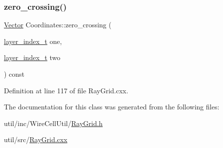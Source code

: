 \subsubsection{\texorpdfstring{zero\+\_\+crossing()}{zero\_crossing()}}
{\footnotesize\ttfamily \hyperlink{namespace_wire_cell_aa3c82d3ba85f032b0d278b7004846800}{Vector} Coordinates\+::zero\+\_\+crossing (\begin{DoxyParamCaption}\item[{\hyperlink{namespace_wire_cell_1_1_ray_grid_ab7562e54b58eede813d5b70b5eb85812}{layer\+\_\+index\+\_\+t}}]{one,  }\item[{\hyperlink{namespace_wire_cell_1_1_ray_grid_ab7562e54b58eede813d5b70b5eb85812}{layer\+\_\+index\+\_\+t}}]{two }\end{DoxyParamCaption}) const}



Definition at line 117 of file Ray\+Grid.\+cxx.



The documentation for this class was generated from the following files\+:\begin{DoxyCompactItemize}
\item 
util/inc/\+Wire\+Cell\+Util/\hyperlink{_ray_grid_8h}{Ray\+Grid.\+h}\item 
util/src/\hyperlink{_ray_grid_8cxx}{Ray\+Grid.\+cxx}\end{DoxyCompactItemize}

